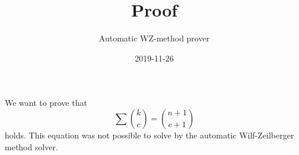 \documentclass{article}
\title{Proof}
\author{Automatic WZ-method prover}
\date{2019-11-26}
\begin{document}
\maketitle
We want to prove that
\begin{equation}\label{Eq: 1}
\sum \binom{k}{c} = \binom{n+1}{c+1}
\end{equation}
holds. This equation was not possible to solve by the automatic Wilf-Zeilberger method solver.
\end{document}
